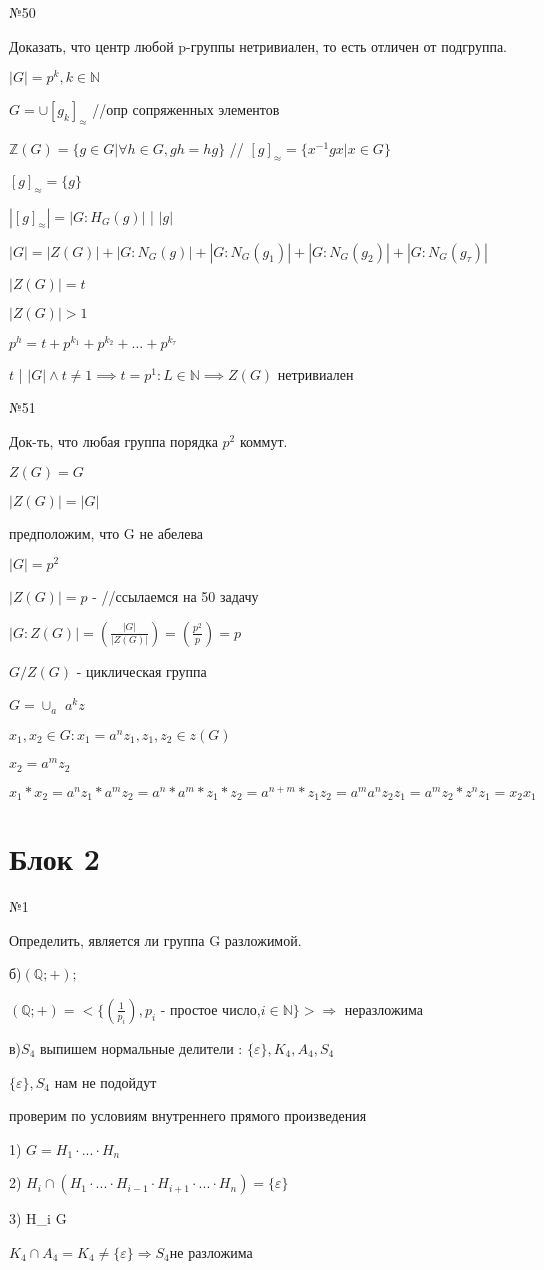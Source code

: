 \documentclass[14pt, letterpaper, twoside]{article}
\begin{document}
\par
\noindent№50
\par
Доказать, что центр любой p-группы нетривиален, то есть отличен от подгруппа.

$|G| = p^k,k \in \mathbb {N}$

$G =    \cup [g_k]_ \approx$ //опр сопряженных элементов

$\mathbb {Z}(G)=\{g \in G |     \forall h \in G, gh=hg \}$ // $[g]_\approx = \{x^{-1}gx|x \in G \}$

$[g]_\approx = \{g\}$

$|[g]_\approx| = |G : H_G(g)|$ | $|g|$

$|G| = |Z(G)|+|G:N_G(g)| + |G:N_G(g_1)| + |G:N_G(g_2)| + |G:N_G(g_\tau)|$

$|Z(G)| = t$

$|Z(G)| > 1$

$p^h = t + p^{k_1} + p^{k_2} + ... +  p^{k_\tau}$

$t$ | $|G| \land t \neq 1 \implies t = p^1 : L \in \mathbb {N} \implies Z(G)$ нетривиален

\noindent№51

Док-ть, что любая группа порядка $p^2$ коммут.

$Z(G) = G$

$|Z(G)| = |G|$

предположим, что G не абелева

$|G| = p^2$

$|Z(G)| = p$ - //ссылаемся на 50 задачу

$|G:Z(G)| = \left(\frac{|G|}{|Z(G)|}\right) = \left(\frac{p^2}{p}\right) = p$

$G/Z(G)$ - циклическая группа

$G = \cup_a $ $a^kz$

$x_1,x_2 \in G : x_1 = a^n z_1, z_1,z_2 \in z(G) $

$x_2 = a^m z_2$

$x_1*x_2=a^nz_1*a^mz_2=a^n*a^m*z_1*z_2 = a^{n+m}*z_1z_2=a^ma^nz_2z_1=a^mz_2*z^nz_1=x_2x_1$
\section{Блок 2}
\par
\noindent№1
\par
Определить, является ли группа G разложимой.
\par
\noindent б)$(\mathbb {Q};+);$
\par
$(\mathbb {Q};+) = <\{\left(\frac{1}{p_i}\right),p_i$ - простое число,$i \in \mathbb {N}\}> \Rightarrow $ неразложима
\par
\noindent в)$S_4$
выпишем нормальные делители : $\{ \varepsilon\},K_4,A_4,S_4$
\par
$\{ \varepsilon\},S_4 $ нам не подойдут
\par
проверим по условиям внутреннего прямого произведения
\par
1) $G = H_1 \cdot ... \cdot H_n$
\par
2) $H_i \cap (H_1 \cdot ... \cdot H_{i-1} \cdot H_{i+1} \cdot ... \cdot H_n) = \{ \varepsilon\}$
\par
3){ H_i \triangleleft G}
\par
$K_4\cap A_4 = K_4 \neq \{ \varepsilon\} \Rightarrow S_4 $не разложима
\end{document}

